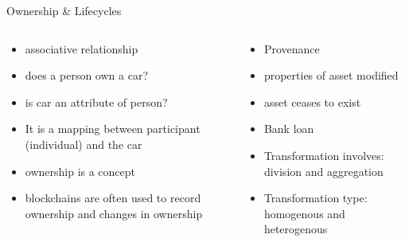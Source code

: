 \documentclass[pdf,table]{beamer}
\begin{document}
\begin{frame}{Ownership \& Lifecycles}
	\begin{columns}[T]
		\begin{column}{0.48\textwidth}
			\begin{itemize}
				\item associative relationship %
				\item does a person own a car?
				\item is car an attribute of person?
				\item It is a mapping between participant (individual) and the car
				\item ownership is a concept
				\item blockchains are often used to record ownership and changes in ownership
			\end{itemize}
		\end{column}
		\begin{column}{0.48\textwidth}
			\begin{itemize}
				\item Provenance
				\item properties of asset modified
				\item asset ceases to exist
				\item Bank loan
				\item Transformation involves: division and aggregation
				\item Transformation type: homogenous and heterogenous
			\end{itemize}
		\end{column}
	\end{columns}	
\end{frame}
\end{document}
